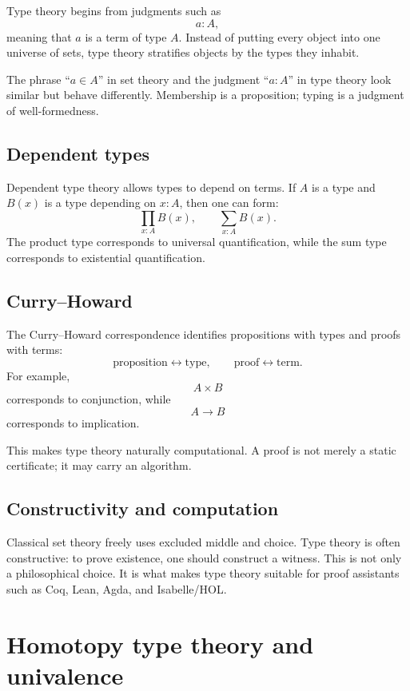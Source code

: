 Type theory begins from judgments such as
\[
  a:A,
\]
meaning that \(a\) is a term of type \(A\).  Instead of putting every object into one universe of sets, type theory stratifies objects by the types they inhabit.

\begin{remark}
The phrase ``\(a\in A\)'' in set theory and the judgment ``\(a:A\)'' in type theory look similar but behave differently.  Membership is a proposition; typing is a judgment of well-formedness.
\end{remark}

\subsection{Dependent types}

Dependent type theory allows types to depend on terms.  If \(A\) is a type and \(B(x)\) is a type depending on \(x:A\), then one can form:
\[
  \prod_{x:A}B(x),
  \qquad
  \sum_{x:A}B(x).
\]
The product type corresponds to universal quantification, while the sum type corresponds to existential quantification.

\subsection{Curry--Howard}

The Curry--Howard correspondence identifies propositions with types and proofs with terms:
\[
  \text{proposition} \leftrightarrow \text{type},
  \qquad
  \text{proof} \leftrightarrow \text{term}.
\]
For example,
\[
  A\times B
\]
corresponds to conjunction, while
\[
  A\to B
\]
corresponds to implication.

This makes type theory naturally computational.  A proof is not merely a static certificate; it may carry an algorithm.

\subsection{Constructivity and computation}

Classical set theory freely uses excluded middle and choice.  Type theory is often constructive: to prove existence, one should construct a witness.  This is not only a philosophical choice.  It is what makes type theory suitable for proof assistants such as Coq, Lean, Agda, and Isabelle/HOL.

\section{Homotopy type theory and univalence}

